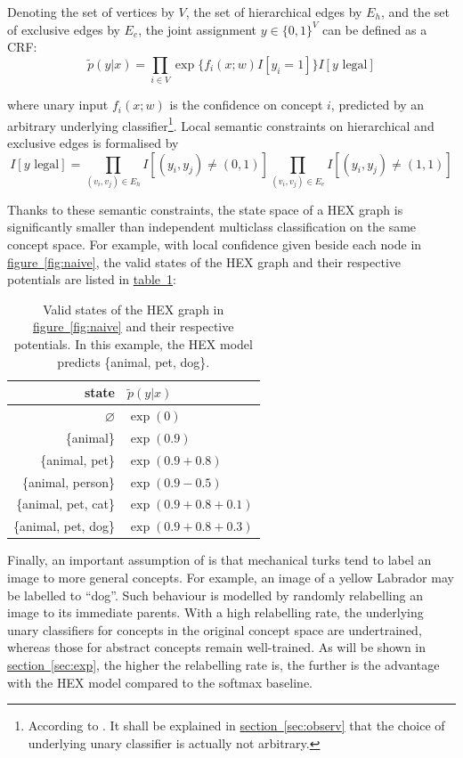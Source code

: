 \documentclass[11pt,a4paper]{article}
\begin{document}
Denoting the set of vertices by $V$, the set of hierarchical edges by $E_h$, and the set of exclusive edges by $E_e$, the joint assignment $y\in\{0,1\}^V$ can be defined as a CRF:
\begin{equation}
\tilde{p}(y|x)=\prod_{i\in V}\exp\{f_i(x;w)I[y_i=1]\}I[y\text{ legal}]
\label{eqn:naive}
\end{equation}

where unary input $f_i(x;w)$ is the confidence on concept $i$, predicted by an arbitrary underlying classifier\footnote{According to \cite{deng2014large}. It shall be explained in \hyperref[sec:observ]{section~\ref{sec:observ}} that the choice of underlying unary classifier is actually not arbitrary.}. Local semantic constraints on hierarchical and exclusive edges is formalised by
\begin{equation}
I[y\text{ legal}]=\prod_{(v_i,v_j)\in E_h}I[(y_i,y_j)\neq(0,1)]\prod_{(v_i,v_j)\in E_e}I[(y_i,y_j)\neq(1,1)]
\label{eqn:legal}
\end{equation}

Thanks to these semantic constraints, the state space of a HEX graph is significantly smaller than independent multiclass classification on the same concept space. For example, with local confidence given beside each node in \hyperref[fig:naive]{figure~\ref{fig:naive}}, the valid states of the HEX graph and their respective potentials are listed in \hyperref[tab:naive]{table~\ref{tab:naive}}:

\begin{table}[htbp]
\centering
\begin{tabular}{r|l}
state & $\tilde{p}(y|x)$\\
\hline
$\varnothing$ & $\exp(0)$\\
\{animal\} & $\exp(0.9)$\\
\{animal, pet\} & $\exp(0.9+0.8)$\\
\{animal, person\} & $\exp(0.9-0.5)$\\
\{animal, pet, cat\} & $\exp(0.9+0.8+0.1)$\\
\{animal, pet, dog\} & $\exp(0.9+0.8+0.3)$
\end{tabular}
\caption{Valid states of the HEX graph in \hyperref[fig:naive]{figure~\ref{fig:naive}} and their respective potentials. In this example, the HEX model predicts \{animal, pet, dog\}.}
\label{tab:naive}
\end{table}

Finally, an important assumption of \cite{deng2014large} is that mechanical turks tend to label an image to more general concepts. For example, an image of a yellow Labrador may be labelled to ``dog''. Such behaviour is modelled by randomly relabelling an image to its immediate parents. With a high relabelling rate, the underlying unary classifiers for concepts in the original concept space are undertrained, whereas those for abstract concepts remain well-trained. As will be shown in \hyperref[sec:exp]{section~\ref{sec:exp}}, the higher the relabelling rate is, the further is the advantage with the HEX model compared to the softmax baseline.
\end{document}

